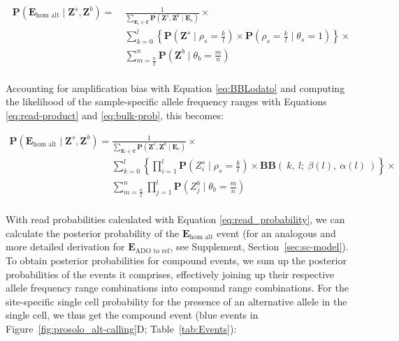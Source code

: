 \documentclass[12pt,inline]{wlscirep}
\newcommand{\Prob}{{\mathbf{P}}}
\newcommand{\cB}{{\mathbf{B}}}
\begin{document}
\begin{equation}
 \label{eq:hom-alt-posterior-likelihoods}
 \begin{split}   
 \Prob(\boldsymbol{E}_{\text{hom alt}} \mid \boldsymbol{Z}^s,\boldsymbol{Z}^b)
   =~&\frac{1}{\sum_{\boldsymbol{E}_e \in \mathfrak{E}}{\Prob(\boldsymbol{Z}^s,\boldsymbol{Z}^b \mid \boldsymbol{E}_e )}} \times \\
     &\sum_{k=0}^{l} \left\{ \Prob(\boldsymbol{Z}^s \mid \rho_s = \frac{k}{l}) \times \Prob(\rho_s = \frac{k}{l} \mid \theta_s =  1)\right\} \times \\
     &\sum_{m=\frac{n}{2}}^{n} \Prob(\boldsymbol{Z}^b \mid \theta_b = \frac{m}{n})\\
  \end{split}    
\end{equation}

Accounting for amplification bias with Equation \ref{eq:BBLodato} and computing the likelihood of the sample-specific allele frequency ranges with Equations \ref{eq:read-product} and \ref{eq:bulk-prob}, this becomes:

\begin{equation}
 \label{eq:hom-alt-posterior-reads}
 \begin{split}   
 \Prob(\boldsymbol{E}_{\text{hom alt}} \mid \boldsymbol{Z}^s,\boldsymbol{Z}^b)
   =~&\frac{1}{\sum_{\boldsymbol{E}_e \in \mathfrak{E}}{\Prob(\boldsymbol{Z}^s,\boldsymbol{Z}^b \mid \boldsymbol{E}_e )}} \times \\
      &\sum_{k=0}^{l} \left\{ \prod_{i=1}^l \Prob(Z_i^s \mid \rho_s = \frac{k}{l}) \times \cB\cB(~ k,~ l;~ \beta(l),~ \alpha(l)~ ) \right\} \times\\
      &\sum_{m=\frac{n}{2}}^{n} \prod_{j=1}^l \Prob\left(Z_j^b \mid \theta_b = \frac{m}{n} \right)\\
  \end{split}    
\end{equation}

With read probabilities calculated with Equation \ref{eq:read_probability}, we can calculate the posterior probability of the $\boldsymbol{E}_{\text{hom alt}}$ event (for an analogous and more detailed derivation for $\boldsymbol{E}_{\text{ADO to ref}}$, see Supplement, Section~\ref{sec:sc-model}).
To obtain posterior probabilities for compound events, we sum up the posterior probabilities of the events it comprises, effectively joining up their respective allele frequency range combinations into compound range combinations.
For the site-specific single cell probability for the presence of an alternative allele in the single cell, we thus get the compound event (blue events in Figure~\ref{fig:prosolo_alt-calling}D; Table~\ref{tab:Events}):
\end{document}
